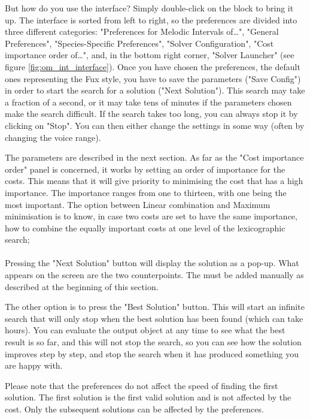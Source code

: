 But how do you use the interface? Simply double-click on the block to bring it up. The interface is sorted from left to right, so the preferences are divided into three different categories: "Preferences for Melodic Intervals of\dots", "General Preferences", "Species-Specific Preferences", "Solver Configuration", "Cost importance order of\dots", and, in the bottom right corner, "Solver Launcher" (see figure \ref{fig:om_int_interface}). Once you have chosen the preferences, the default ones representing the Fux style, you have to save the parameters ("Save Config") in order to start the search for a solution ("Next Solution"). This search may take a fraction of a second, or it may take tens of minutes if the parameters chosen make the search difficult. If the search takes too long, you can always stop it by clicking on "Stop". You can then either change the settings in some way (often by changing the voice range).

The parameters are described in the next section. As far as the "Cost importance order" panel is concerned, it works by setting an order of importance for the costs. This means that it will give priority to minimising the cost that has a high importance. The importance ranges from one to thirteen, with one being the most important. The option between Linear combination and Maximum minimisation is to know, in case two costs are set to have the same importance, how to combine the equally important costs at one level of the lexicographic search;

\paragraph{}
Pressing the "Next Solution" button will display the solution as a pop-up. What appears on the screen are the two counterpoints. The \cfs must be added manually as described at the beginning of this section. 


The other option is to press the "Best Solution" button. This will start an infinite search that will only stop when the best solution has been found (which can take hours). You can evaluate the output object at any time to see what the best result is so far, and this will not stop the search, so you can see how the solution improves step by step, and stop the search when it has produced something you are happy with.


Please note that the preferences do not affect the speed of finding the first solution. The first solution is the first valid solution and is not affected by the cost. Only the subsequent solutions can be affected by the preferences.

